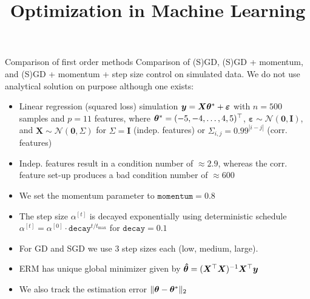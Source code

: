 \documentclass[11pt,compress,t,notes=noshow, xcolor=table]{beamer}
\title{Optimization in Machine Learning}
\begin{document}


\begin{vbframe}{Comparison of first order methods}
Comparison of (S)GD, (S)GD + momentum, and (S)GD + momentum + step size control on simulated data. We do not use analytical solution on purpose although one exists:

\begin{itemize}
    \item Linear regression (squared loss) simulation $\bm{y} = \bm{X}\bm{\theta}^{\ast} + \bm{\varepsilon}$ with $n=500$ samples and $p=11$ features, where $\bm{\theta}^{\ast}=(-5,-4,\ldots,4,5)^{\top}$, $\bm{\varepsilon} \sim \mathcal{N}(\bm{0}, \bm{I})$, and $\bm{X} \sim \mathcal{N}(\bm{0}, \Sigma)$ for $\Sigma=\bm{I}$ (indep. features) or $\Sigma_{i,j}=0.99^{|i-j|}$ (corr. features)
    \item Indep. features result in a condition number of $\approx 2.9$, whereas the corr. feature set-up produces a bad condition number of $\approx 600$
    \item We set the momentum parameter to $\texttt{momentum}=0.8$
    \item The step size $\alpha^{[t]}$ is decayed exponentially using deterministic schedule $\alpha^{[t]}=\alpha^{[0]} \cdot \texttt{decay}^{t/t_{\text{max}}}$ for $\texttt{decay}=0.1$
    \item For GD and SGD we use 3 step sizes each (low, medium, large). %
    \item ERM has unique global minimizer given by $\bm{\hat{\theta}} = (\bm{X}^{\top}\bm{X})^{-1}\bm{X}^{\top} \bm{y}$
    \item We also track the estimation error $\Vert \bm{\theta} - \bm{\theta}^{\ast} \Vert_2$
\end{itemize}

\end{vbframe}

\end{document}
